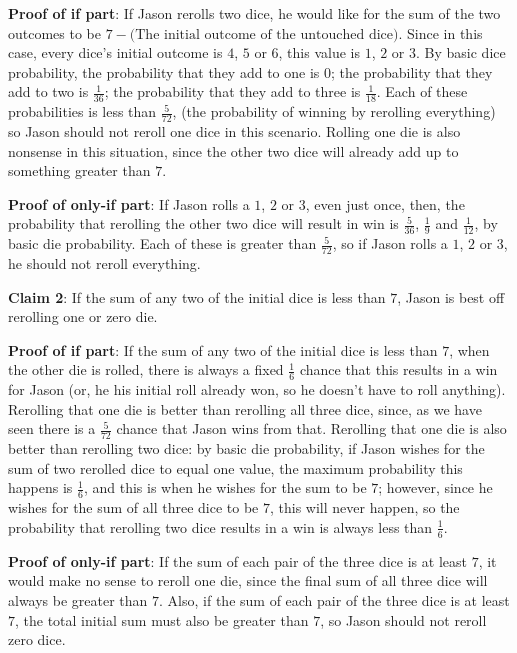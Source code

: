 \begin{enumerate}
 \textbf{Proof of if part}: If Jason rerolls two dice, he would like for the sum of the two outcomes to be $7-\text{(The initial outcome of the untouched dice)}$. Since in this case, every dice's initial outcome is $4$, $5$ or $6$, this value is $1$, $2$ or $3$. By basic dice probability, the probability that they add to one is $0$; the probability that they add to two is $\frac{1}{36}$; the probability that they add to three is $\frac{1}{18}$. Each of these probabilities is less than $\frac{5}{72}$, (the probability of winning by rerolling everything) so Jason should not reroll one dice in this scenario. Rolling one die is also nonsense in this situation, since the other two dice will already add up to something greater than $7$.

 \textbf{Proof of only-if part}: If Jason rolls a $1$, $2$ or $3$, even just once, then, the probability that rerolling the other two dice will result in win is $\frac{5}{36}$, $\frac{1}{9}$ and $\frac{1}{12}$, by basic die probability. Each of these is greater than $\frac{5}{72}$, so if Jason rolls a $1$, $2$ or $3$, he should not reroll everything.

 \textbf{Claim 2}: If the sum of any two of the initial dice is less than $7$, Jason is best off rerolling one or zero die.

 \textbf{Proof of if part}: If the sum of any two of the initial dice is less than $7$, when the other die is rolled, there is always a fixed $\frac{1}{6}$ chance that this results in a win for Jason (or, he his initial roll already won, so he doesn't have to roll anything). Rerolling that one die is better than rerolling all three dice, since, as we have seen there is a $\frac{5}{72}$ chance that Jason wins from that. Rerolling that one die is also better than rerolling two dice: by basic die probability, if Jason wishes for the sum of two rerolled dice to equal one value, the maximum probability this happens is $\frac{1}{6}$, and this is when he wishes for the sum to be $7$; however, since he wishes for the sum of all three dice to be $7$, this will never happen, so the probability that rerolling two dice results in a win is always less than $\frac{1}{6}$.

 \textbf{Proof of only-if part}: If the sum of each pair of the three dice is at least $7$, it would make no sense to reroll one die, since the final sum of all three dice will always be greater than $7$. Also, if the sum of each pair of the three dice is at least $7$, the total initial sum must also be greater than $7$, so Jason should not reroll zero dice.


\end{enumerate}
